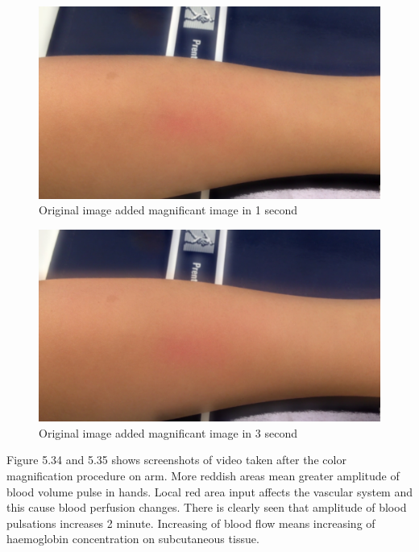 \begin{figure}[!h]
	\centering
	\includegraphics[scale=0.2]{img/eulerian/sample/30}
	\caption{Original image added magnificant image in 1 second}
\end{figure}
\begin{figure}[!h]
	\centering
	\includegraphics[scale=0.2]{img/eulerian/sample/120}
	\caption{Original image added magnificant image in 3 second}
\end{figure}
\newpage
Figure 5.34 and 5.35  shows screenshots of video taken after the color magnification procedure on arm. More reddish areas mean greater
amplitude of blood volume pulse in hands. Local red area input affects the vascular system and this cause blood perfusion changes. There is clearly seen that
amplitude of blood pulsations increases 2 minute. Increasing of blood flow means increasing of haemoglobin concentration on subcutaneous tissue. \\

